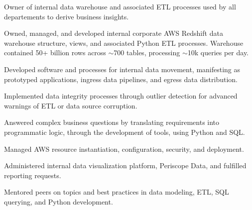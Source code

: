 \documentclass[letter,10pt]{article}
\begin{document}
\vspace{10pt}

Owner of internal data warehouse and associated ETL processes used by all departements to derive business insights.


\vspace{10pt}

\begin{zitemize}
    \item Owned, managed, and developed internal corporate AWS Redshift data warehouse structure, views, and associated Python ETL processes. Warehouse contained 50+ billion rows across $\sim$700 tables, processing $\sim$10k queries per day.
    \item Developed software and processes for internal data movement, manifesting as prototyped applications, ingress data pipelines, and egress data distribution.
    \item Implemented data integrity processes through outlier detection for advanced warnings of ETL or data source corruption.
    \item Answered complex business questions by translating requirements into programmatic logic, through the development of tools, using Python and SQL.
    \item Managed AWS resource instantiation, configuration, security, and deployment.
    \item Administered internal data visualization platform, Periscope Data, and fulfilled reporting requests.
    \item Mentored peers on topics and best practices in data modeling, ETL, SQL querying, and Python development.
\end{zitemize}

\vspace{5pt}

\end{document}
